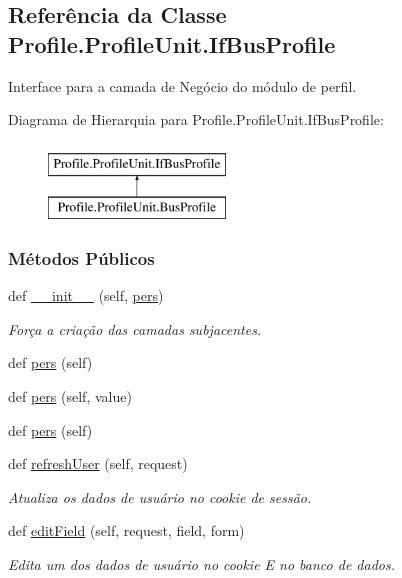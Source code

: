\hypertarget{classProfile_1_1ProfileUnit_1_1IfBusProfile}{}\subsection{Referência da Classe Profile.\+Profile\+Unit.\+If\+Bus\+Profile}
\label{classProfile_1_1ProfileUnit_1_1IfBusProfile}


Interface para a camada de Negócio do módulo de perfil.  


Diagrama de Hierarquia para Profile.\+Profile\+Unit.\+If\+Bus\+Profile\+:\begin{figure}[H]
\begin{center}
\leavevmode
\includegraphics[height=2.000000cm]{dc/d47/classProfile_1_1ProfileUnit_1_1IfBusProfile}
\end{center}
\end{figure}
\subsubsection*{Métodos Públicos}
\begin{DoxyCompactItemize}
\item 
def \hyperlink{classProfile_1_1ProfileUnit_1_1IfBusProfile_ac6c25c4db077336b1730a9e115048d78}{\+\_\+\+\_\+init\+\_\+\+\_\+} (self, \hyperlink{classProfile_1_1ProfileUnit_1_1IfBusProfile_abe265adaf3fd39d6534f9ad4c9ba8abb}{pers})
\begin{DoxyCompactList}\small\item\em Força a criação das camadas subjacentes. \end{DoxyCompactList}\item 
def \hyperlink{classProfile_1_1ProfileUnit_1_1IfBusProfile_acf7fb65f3c12a9a210189c09d3ef1b00}{pers} (self)
\item 
def \hyperlink{classProfile_1_1ProfileUnit_1_1IfBusProfile_aef302dd16353111e49984fd59fb52b5f}{pers} (self, value)
\item 
def \hyperlink{classProfile_1_1ProfileUnit_1_1IfBusProfile_acf7fb65f3c12a9a210189c09d3ef1b00}{pers} (self)
\item 
def \hyperlink{classProfile_1_1ProfileUnit_1_1IfBusProfile_a29418660237655a745c52eff725c7176}{refresh\+User} (self, request)
\begin{DoxyCompactList}\small\item\em Atualiza os dados de usuário no cookie de sessão. \end{DoxyCompactList}\item 
def \hyperlink{classProfile_1_1ProfileUnit_1_1IfBusProfile_a354782f4be9cd609f3c8754fad16f1ba}{edit\+Field} (self, request, field, form)
\begin{DoxyCompactList}\small\item\em Edita um dos dados de usuário no cookie E no banco de dados. \end{DoxyCompactList}\end{DoxyCompactItemize}
